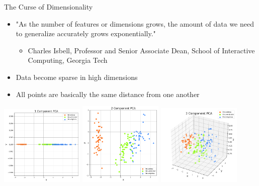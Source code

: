 \documentclass[aspectratio=169]{beamer}
\begin{document}
\begin{frame}{The Curse of Dimensionality}


\begin{itemize}
		\item "As the number of features or dimensions grows, the amount of data we need to generalize accurately grows exponentially."
\begin{itemize}

	\item Charles Isbell, Professor and Senior Associate Dean, School of Interactive Computing, Georgia Tech
\end{itemize}
		\item Data become sparse in high dimensions
		\item All points are basically the same distance from one another
\end{itemize}
\includegraphics[width=0.3\textwidth]{lectDimRed/dimensionReduce_1d.png}
\includegraphics[width=0.3\textwidth]{lectDimRed/dimensionReduce_2d.png}
\includegraphics[width=0.3\textwidth]{lectDimRed/dimensionReduce_3d.png}

\end{frame}
\end{document}
